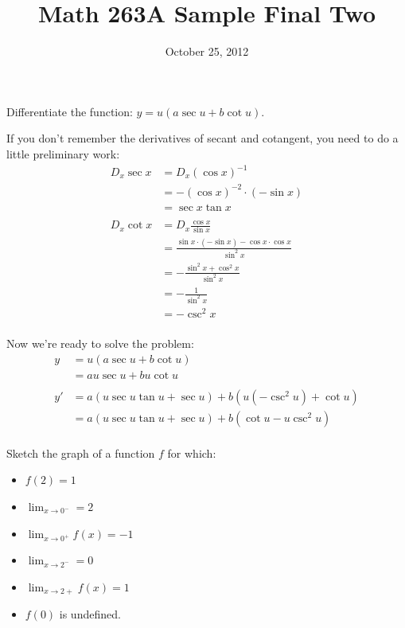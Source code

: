 \documentclass[fleqn,addpoints]{exam}
\title{Math 263A Sample Final Two}
\date{October 25, 2012}
\author{}
\begin{document}
\maketitle  

\begin{questions}

\question Differentiate the function: $y = u (a \sec u + b \cot u)$.
\begin{solution}
If you don't remember the derivatives of secant and cotangent, you need to do a little preliminary work:
\begin{align*}
  D_x \sec x &= D_x (\cos x)^{-1} \\
  &= - (\cos x)^{-2} \cdot (- \sin x) \\
  &= \sec x \tan x \\
\\
  D_x \cot x &= D_x \frac{\cos x}{\sin x} \\
  &= \frac{\sin x \cdot (-\sin x) - \cos x \cdot \cos x}{\sin^2 x} \\
  &= - \frac{\sin^2 x + \cos^2 x}{\sin^2 x} \\
  &= - \frac{1}{\sin^2 x} \\
  &= - \csc^2 x \\
\end{align*}

Now we're ready to solve the problem:
\begin{align*}
  y &= u (a \sec u + b \cot u) \\
    &= au \sec u + bu \cot u \\  
\\
  y' &= a (u \sec u \tan u + \sec u) + b(u (- \csc^2 u) + \cot u) \\
     &= a (u \sec u \tan u + \sec u) + b(\cot u - u \csc^2 u) \\
\end{align*}
\end{solution}

\question Sketch the graph of a function $f$ for which:
\begin{itemize}
  \item $f(2) = 1$
  \item $\lim_{x \to 0^-} = 2$
  \item $\lim_{x \to 0^+} f(x) = -1$
  \item $\lim_{x \to 2^-} = 0$
  \item $\lim_{x \to 2+} f(x) = 1$
  \item $f(0)$ is undefined.
\end{itemize}


\end{questions}
\end{document}

